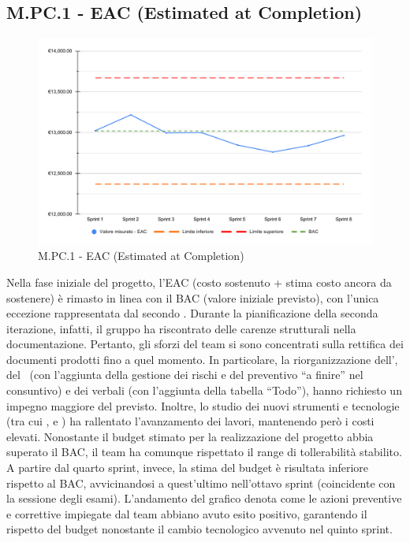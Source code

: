 \subsection{M.PC.1 - EAC (Estimated at Completion)}
\begin{figure}[H]
    \centering
    \includegraphics[width=\textwidth]{assets/stima_a_finire.pdf}
    \caption{M.PC.1 - EAC (Estimated at Completion)}
\end{figure}

\par Nella fase iniziale del progetto, l’EAC (costo sostenuto + stima costo ancora da sostenere) è rimasto in linea con il BAC (valore iniziale previsto), con l’unica eccezione rappresentata dal secondo . Durante la pianificazione della seconda iterazione, infatti, il gruppo ha riscontrato delle carenze strutturali nella documentazione. Pertanto, gli sforzi del team si sono concentrati sulla rettifica dei documenti prodotti fino a quel momento. In particolare, la riorganizzazione dell'\AdR, del \PdP\ (con l'aggiunta della gestione dei rischi e del preventivo “a finire” nel consuntivo) e dei verbali (con l’aggiunta della tabella “Todo”), hanno richiesto un impegno maggiore del previsto. Inoltre, lo studio dei nuovi strumenti e tecnologie (tra cui ,  e ) ha rallentato l’avanzamento dei lavori, mantenendo però i costi elevati. Nonostante il budget stimato per la realizzazione del progetto abbia superato il BAC, il team ha comunque rispettato il range di tollerabilità stabilito. A partire dal quarto sprint, invece, la stima del budget è risultata inferiore rispetto al BAC, avvicinandosi a quest’ultimo nell’ottavo sprint (coincidente con la sessione degli esami). L’andamento del grafico denota come le azioni preventive e correttive impiegate dal team abbiano avuto esito positivo, garantendo il rispetto del budget nonostante il cambio tecnologico avvenuto nel quinto sprint.